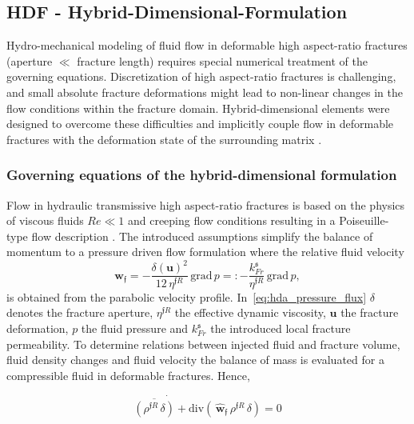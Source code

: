 \subsection{HDF - Hybrid-Dimensional-Formulation}

Hydro-mechanical modeling of fluid flow in deformable high aspect-ratio fractures (aperture $\ll$ fracture length) requires special numerical treatment of the governing equations. Discretization of high aspect-ratio fractures is challenging, and small absolute fracture deformations might lead to non-linear changes in the flow conditions within the fracture domain. Hybrid-dimensional elements were designed to overcome these difficulties and implicitly couple flow in deformable fractures with the deformation state of the surrounding matrix \cite{vinci2014, vinci2015,KIM20112094,KIM20111591,Girault2015,Girault2016,Castelletto2015,segura2004,segura2008coupledI,segura2008coupledII,vinci2014hydro,settgast2017fully,schmidt2019}.
\subsubsection*{Governing equations of the hybrid-dimensional formulation}
Flow in hydraulic transmissive high aspect-ratio fractures is based on the physics of viscous fluids $Re \ll 1$ and creeping flow conditions resulting in a Poiseuille-type flow description \cite{witherspoon1979}. The introduced assumptions simplify the balance of momentum to a pressure driven flow formulation where the relative fluid velocity 
\begin{equation}
\label{eq:hda_pressure_flux}
\mathbf{w}_\mathfrak{f} = -\frac{\delta(\mathbf{u})^2}{12\,\eta^{\mathfrak{f}R}} \, \text{grad} \, p
=: -\frac{k^\mathfrak{s}_{Fr}}{\eta^{\mathfrak{f}R}} \, \text{grad} \, p,
\end{equation}
is obtained from the parabolic velocity profile. In~\eqref{eq:hda_pressure_flux} $\delta$ denotes the fracture aperture, $\eta^{\mathfrak{f}R}$ the effective dynamic viscosity, $\mathbf{u}$ the fracture deformation, $p$ the fluid pressure and $k^\mathfrak{s}_{Fr}$ the introduced local fracture permeability.
To determine relations between injected fluid and fracture volume, fluid density changes and fluid velocity the balance of mass is evaluated for a compressible fluid in deformable fractures. Hence,

\begin{equation}
\label{eq:hda_balance_of_mass}
\dot{\overline{(\rho^{\mathfrak{f}R}\,\delta)} + \text{div}}
\left(\, \hat{\mathbf{w}}_\mathfrak{f} \, \rho^{\mathfrak{f}R}\, \delta\right) = 0
\end{equation}


